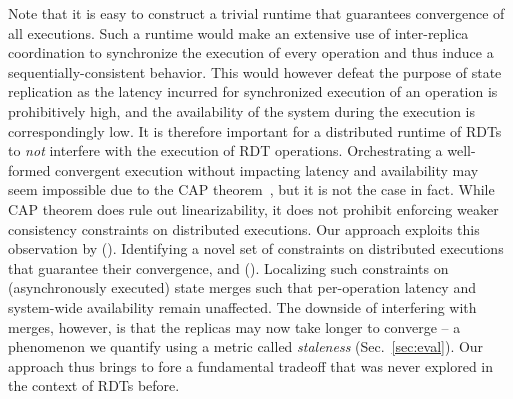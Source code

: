 Note that it is easy to construct a trivial runtime that guarantees
convergence of all executions. Such a runtime would make an extensive
use of inter-replica coordination to synchronize the execution of
every operation and thus induce a sequentially-consistent behavior.
This would however defeat the purpose of state replication as the
latency incurred for synchronized execution of an operation is
prohibitively high, and the availability of the system during the
execution is correspondingly low. It is therefore important for a
distributed runtime of RDTs to \emph{not} interfere with the execution
of RDT operations. Orchestrating a well-formed convergent execution
without impacting latency and availability may seem impossible due to
the CAP theorem~\cite{cap}, but it is not the case in fact. While CAP
theorem does rule out linearizability, it does not prohibit enforcing
weaker consistency constraints on distributed executions. Our approach
exploits this observation by ().  Identifying a novel set of
constraints on distributed executions that guarantee their
convergence, and (). Localizing such constraints on
(asynchronously executed) state merges such that per-operation latency
and system-wide availability remain unaffected. The downside of
interfering with merges, however, is that the replicas may now take
longer to converge -- a phenomenon we quantify using a metric called
\emph{staleness} (Sec.~\ref{sec:eval}). Our approach thus brings to
fore a fundamental tradeoff that was never explored in the context of
RDTs before.


